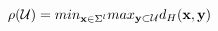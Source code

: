 \documentclass[preview]{standalone}
\begin{document}
\begin{center}
$\rho (\mathcal{U}) = min_{\textbf{x}\in \Sigma^l} max_{\textbf{y}\\ \subset \mathcal{U}} d_H(\textbf{x},\textbf{y})$
\end{center}
\end{document}
